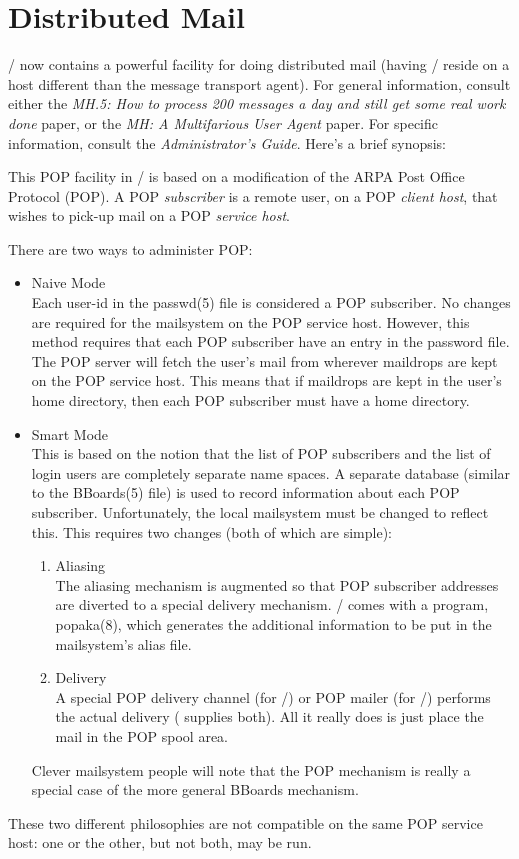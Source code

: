 \section*	{Distributed Mail}
\MH/ now contains a powerful facility for doing distributed mail
(having \MH/ reside on a host different than the message transport agent).
For general information,
consult either the 
{\em MH.5: How to process 200 messages a day and still get some real work
done} paper,
or the {\em MH: A Multifarious User Agent} paper.
For specific information,
consult the {\em Administrator's Guide}.
Here's a brief synopsis:

This POP facility in \MH/ is based on a modification of the ARPA Post
Office Protocol (POP).
A POP {\em subscriber\/} is a remote user,
on a POP {\em client host},
that wishes to pick-up mail on a POP {\em service host}.

There are two ways to administer POP:
\begin{itemize}
\item	Naive Mode\\
Each user-id in the \man passwd(5) file is considered a POP subscriber.
No changes are required for the mailsystem on the POP service host.
However,
this method requires that each POP subscriber have an entry in the password
file.
The POP server will fetch the user's mail from wherever maildrops are kept on
the POP service host.
This means that if maildrops are kept in the user's home directory,
then each POP subscriber must have a home directory.

\item	Smart Mode\\
This is based on the notion that the list of POP subscribers and the list of
login users are completely separate name spaces.
A separate database (similar to the \man BBoards(5) file)
is used to record information about each POP subscriber.
Unfortunately,
the local mailsystem must be changed to reflect this.
This requires two changes (both of which are simple):
\begin{enumerate}
\item	Aliasing\\
	The aliasing mechanism is augmented so that POP subscriber addresses
	are diverted to a special delivery mechanism.
	\MH/ comes with a program, \man popaka(8), which generates the
	additional information to be put in the mailsystem's alias file.
\item	Delivery\\
	A special POP delivery channel (for \MMDFII/)
	or POP mailer (for \SendMail/) performs the actual delivery (
	supplies both).
	All it really does is just place the mail in the POP spool area.
\end{enumerate}
Clever mailsystem people will note that
the POP mechanism is really a special case of the more general
BBoards mechanism.
\end{itemize}
These two different philosophies are not compatible on the same POP service
host: one or the other, but not both, may be run.

